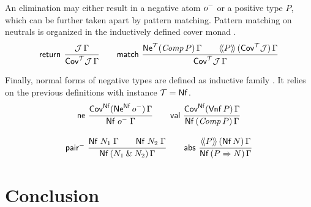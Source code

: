 \documentclass[a4paper,USenglish,cleveref, autoref]{lipics-v2019}
\begin{document}
An elimination may either result in a negative atom $o^-$ or a
positive type $P$, which can be further taken apart by pattern
matching.  Pattern matching on neutrals is organized in the
inductively defined cover monad \fbox{$\Cov[\T]$}.
\begin{gather*}
  \nru{\treturn}{\J\,\Gamma}{\CoverT \J \Gamma}
\qquad
  \nru{\tmatch}
      {\NeTP {\Comp P} \Gamma \qquad \AddHypP P {\Cov[\T]\J} \Gamma}
      {\CoverT \J \Gamma}
\end{gather*}

Finally, normal forms of negative types are defined as inductive
family .  It relies on the previous definitions
with instance $\mathcal{T} = \mathsf{Nf}$.
\begin{gather*}
  \nru{\tne}
      {\Cov[\tNf](\tNe[\tNf]\,\natom)\,\Gamma}
      {\Nf {\natom} \Gamma}
\qquad
  \nru{\tval}
      {\Cov[\tNf](\tVNf\,P)\,\Gamma}
      {\NfP {\Comp P} \Gamma}
\\[2ex]
  \nru{\npair}
      {\Nf {N_1} \Gamma \qquad \Nf {N_2} \Gamma}
      {\NfP {N_1 \ntimes N_2} \Gamma}
\qquad
  \nru{\tabs}
      {\AddHypP P {\tNf\, N} \Gamma}
      {\NfP {P \To N} \Gamma}
\end{gather*}


\section{Conclusion}
\label{sec:concl}



\end{document}
